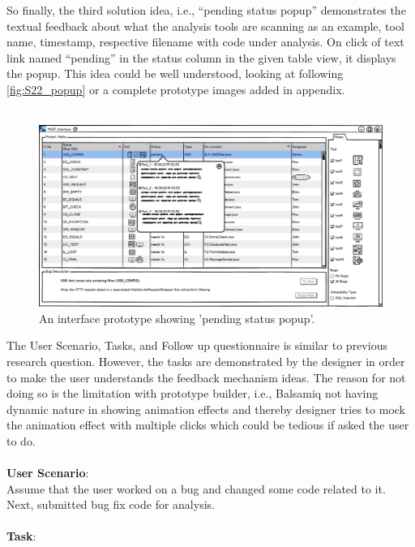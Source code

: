 So finally, the third solution idea, i.e., “pending status popup” demonstrates the textual feedback about what the analysis tools are scanning as an example, tool name, timestamp, respective filename with code under analysis. On click of text link named “pending” in the status column in the given table view, it displays the popup. This idea could be well understood, looking at following \autoref{fig:S22_popup} or a complete prototype images added in appendix. \\ \\


\begin{figure}[hbt!]
	\centering
	\includegraphics[width=\linewidth]{figures/solution_ideas_snaps/S22_popup}
	\caption{An interface prototype showing 'pending status popup'.}
	\label{fig:S22_popup}
\end{figure}

The User Scenario, Tasks, and Follow up questionnaire is similar to previous research question. However, the tasks are demonstrated by the designer in order to make the user understands the feedback mechanism ideas. The reason for not doing so is the limitation with prototype builder, i.e., Balsamiq not having dynamic nature in showing animation effects and thereby designer tries to mock the animation effect with multiple clicks which could be tedious if asked the user to do. \\ \\

\textbf{User Scenario}: \\

Assume that the user worked on a bug and changed some code related to it. Next, submitted bug fix code for analysis. \\ \\

\textbf{Task}: \\

